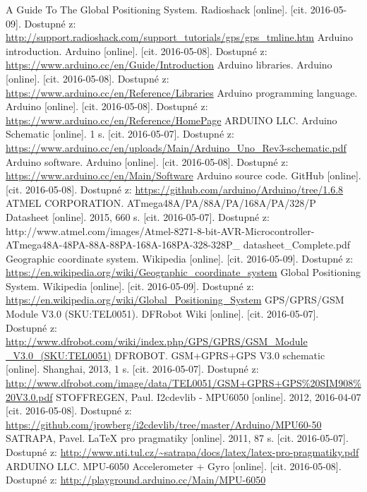 \documentclass[FM,MP]{tulthesis}  %
\begin{document}
\begin{thebibliography}{10}
A Guide To The Global Positioning System. Radioshack [online]. [cit. 2016-05-09]. Dostupné z: \url{http://support.radioshack.com/support\_tutorials/gps/gps\_tmline.htm}
Arduino introduction. Arduino [online]. [cit. 2016-05-08]. Dostupné z: \url{https://www.arduino.cc/en/Guide/Introduction}
Arduino libraries. Arduino [online]. [cit. 2016-05-08]. Dostupné z: \url{https://www.arduino.cc/en/Reference/Libraries}
Arduino programming language. Arduino [online]. [cit. 2016-05-08]. Dostupné z: \url{https://www.arduino.cc/en/Reference/HomePage}
ARDUINO LLC. Arduino Schematic [online]. 1 s. [cit. 2016-05-07]. Dostupné z: \url{https://www.arduino.cc/en/uploads/Main/Arduino\_Uno\_Rev3-schematic.pdf}
 Arduino software. Arduino [online]. [cit. 2016-05-08]. Dostupné z: \url{https://www.arduino.cc/en/Main/Software}
Arduino source code. GitHub [online]. [cit. 2016-05-08]. Dostupné z: \url{https://github.com/arduino/Arduino/tree/1.6.8}
ATMEL CORPORATION. ATmega48A/PA/88A/PA/168A/PA/328/P Datasheet [online]. 2015, 660 s. [cit. 2016-05-07]. Dostupné z: http://www.atmel.com/images/Atmel-8271-8-bit-AVR-Microcontroller-ATmega48A-48PA-88A-88PA-168A-168PA-328-328P\_ datasheet\_Complete.pdf
Geographic coordinate system. Wikipedia [online]. [cit. 2016-05-09]. Dostupné z: \url{https://en.wikipedia.org/wiki/Geographic\_coordinate\_system}
Global Positioning System. Wikipedia [online]. [cit. 2016-05-09]. Dostupné z: \url{https://en.wikipedia.org/wiki/Global\_Positioning\_System}
GPS/GPRS/GSM Module V3.0 (SKU:TEL0051). DFRobot Wiki [online]. [cit. 2016-05-07]. Dostupné z: \url{http://www.dfrobot.com/wiki/index.php/GPS/GPRS/GSM\_Module \_V3.0\_(SKU:TEL0051)}
DFROBOT. GSM+GPRS+GPS V3.0 schematic [online]. Shanghai, 2013, 1 s. [cit. 2016-05-07]. Dostupné z: \url{http://www.dfrobot.com/image/data/TEL0051/GSM+GPRS+GPS\%20SIM908\%20V3.0.pdf}
STOFFREGEN, Paul. I2cdevlib - MPU6050 [online]. 2012, 2016-04-07 [cit. 2016-05-08]. Dostupné z: \url{https://github.com/jrowberg/i2cdevlib/tree/master/Arduino/MPU60-50}
SATRAPA, Pavel. LaTeX pro pragmatiky [online]. 2011, 87 s. [cit. 2016-05-07]. Dostupné z: \url{http://www.nti.tul.cz/~satrapa/docs/latex/latex-pro-pragmatiky.pdf}
ARDUINO LLC. MPU-6050 Accelerometer + Gyro [online]. [cit. 2016-05-08]. Dostupné z: \url{http://playground.arduino.cc/Main/MPU-6050}

\end{thebibliography}
\end{document}
